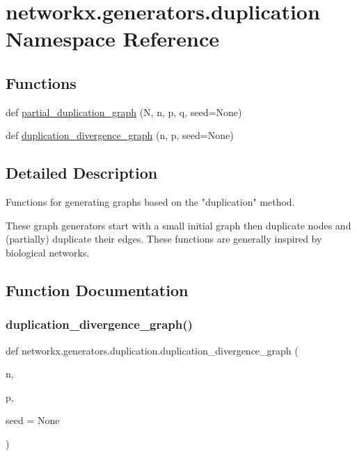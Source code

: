 \hypertarget{namespacenetworkx_1_1generators_1_1duplication}{}\section{networkx.\+generators.\+duplication Namespace Reference}
\label{namespacenetworkx_1_1generators_1_1duplication}
\subsection*{Functions}
\begin{DoxyCompactItemize}
\item 
def \hyperlink{namespacenetworkx_1_1generators_1_1duplication_ac504b7484eda48d8646d686fda3cd439}{partial\+\_\+duplication\+\_\+graph} (N, n, p, q, seed=None)
\item 
def \hyperlink{namespacenetworkx_1_1generators_1_1duplication_aa8a55c75f02f9b4af43dc481f1e5fec4}{duplication\+\_\+divergence\+\_\+graph} (n, p, seed=None)
\end{DoxyCompactItemize}


\subsection{Detailed Description}
\begin{DoxyVerb}Functions for generating graphs based on the "duplication" method.

These graph generators start with a small initial graph then duplicate
nodes and (partially) duplicate their edges. These functions are
generally inspired by biological networks.\end{DoxyVerb}
 

\subsection{Function Documentation}
\mbox{\label{namespacenetworkx_1_1generators_1_1duplication_aa8a55c75f02f9b4af43dc481f1e5fec4}} 
\subsubsection{\texorpdfstring{duplication\+\_\+divergence\+\_\+graph()}{duplication\_divergence\_graph()}}
{\footnotesize\ttfamily def networkx.\+generators.\+duplication.\+duplication\+\_\+divergence\+\_\+graph (\begin{DoxyParamCaption}\item[{}]{n,  }\item[{}]{p,  }\item[{}]{seed = {\ttfamily None} }\end{DoxyParamCaption})}

